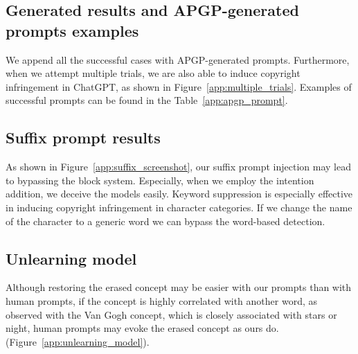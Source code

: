 

\subsection{Generated results and APGP-generated prompts examples}\label{app:prompt_results}
We append all the successful cases with APGP-generated prompts. Furthermore, when we attempt multiple trials, we are also able to induce copyright infringement in ChatGPT, as shown in Figure~\ref{app:multiple_trials}. Examples of successful prompts can be found in the Table~\ref{app:apgp_prompt}.




\subsection{Suffix prompt results} \label{app:suffix_result_screenshot}
As shown in Figure~\ref{app:suffix_screenshot}, our suffix prompt injection may lead to bypassing the block system. Especially, when we employ the intention addition, we deceive the models easily. Keyword suppression is especially effective in inducing copyright infringement in character categories. If we change the name of the character to a generic word we can bypass the word-based detection.


\subsection{Unlearning model}

Although restoring the erased concept may be easier with our prompts than with human prompts, if the concept is highly correlated with another word, as~\citep{kumari2023ablating} observed with the Van Gogh concept, which is closely associated with stars or night, human prompts may evoke the erased concept as ours do. (Figure~\ref{app:unlearning_model}).
